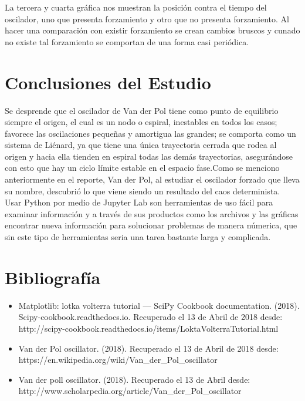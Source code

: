 \documentclass[12pt]{article}
\begin{document}
La tercera y cuarta gráfica nos muestran la posición contra el tiempo del oscilador, uno que presenta forzamiento y otro que no presenta forzamiento. Al hacer una comparación con existir forzamiento se crean cambios bruscos y cunado no existe tal forzamiento se comportan de una forma casi periódica.




\section*{Conclusiones del Estudio}
Se desprende que el oscilador de Van der Pol tiene como punto de equilibrio siempre el origen, el cual es un nodo o espiral,
inestables en todos los casos; favorece las oscilaciones
pequeñas y amortigua las grandes; se comporta como un sistema de Liénard, ya que tiene una única trayectoria cerrada que rodea al origen y hacia ella tienden en espiral todas las demás
trayectorias, asegurándose con esto que hay un ciclo límite estable en el espacio fase.Como se menciono anteriormente en el reporte, Van der Pol, al estudiar el oscilador forzado que lleva su nombre, descubrió lo que viene siendo un resultado del caos determinista. \\

Usar Python por medio de Jupyter Lab son herramientas de uso fácil para examinar información y a través de sus productos como los archivos y las gráficas encontrar nueva información para solucionar problemas de manera númerica, que sin este tipo de herramientas seria una tarea bastante larga y complicada.




\section*{Bibliografía}
\begin{itemize}
\item Matplotlib: lotka volterra tutorial — SciPy Cookbook documentation. (2018). Scipy-cookbook.readthedocs.io. 
Recuperado el 13 de Abril de 2018 desde:\\
http://scipy-cookbook.readthedocs.io/items/LoktaVolterraTutorial.html

\item Van der Pol oscillator. (2018). Recuperado el 13 de Abril de 2018 desde:\\ https://en.wikipedia.org/wiki/Van\_der\_Pol\_oscillator

\item Van der poll oscillator. (2018). Recuperado el 13 de Abril desde: \\
http://www.scholarpedia.org/article/Van\_der\_Pol\_oscillator
\end{itemize}
\end{document}

